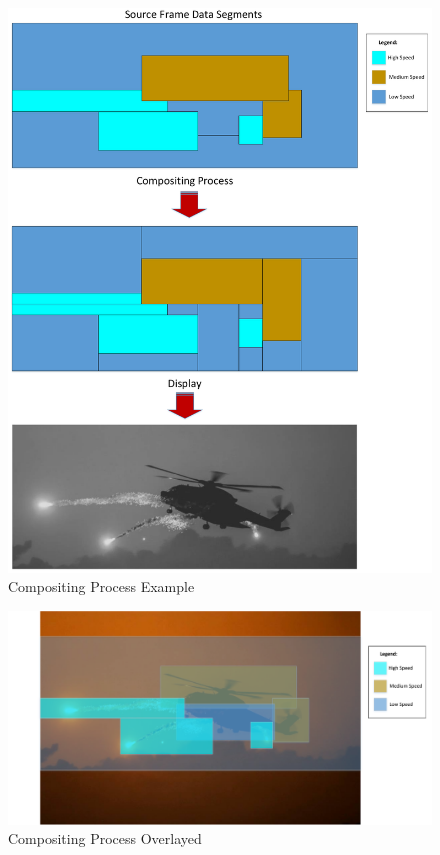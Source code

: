     \begin{figure}
        \centering
        \includegraphics[width=1.0\textwidth]{fig/compositing.pdf}
        \caption{Compositing Process Example}
        \label{fig:compositing}
    \end{figure}

    \begin{figure}
        \centering
        \includegraphics[width=1.0\textwidth]{fig/compositing_combined.pdf}
        \caption{Compositing Process Overlayed}
        \label{fig:compositing_overlayed}
    \end{figure}


